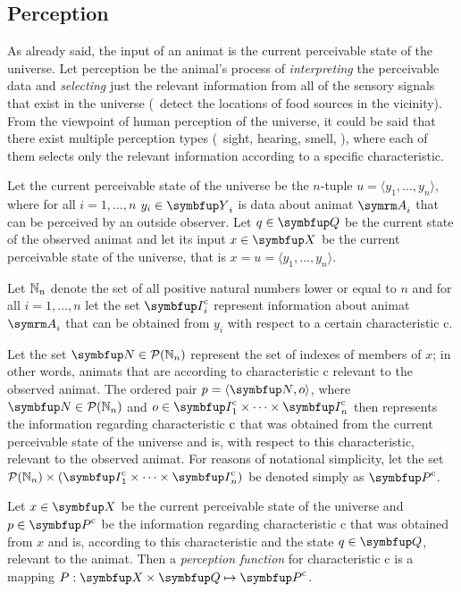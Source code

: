 \subsection{Perception}
As already said, the input of an animat is the current perceivable state of the universe. Let perception be the animal's process of \emph{interpreting} the perceivable data and \emph{selecting} just the relevant information from all of the sensory signals that exist in the universe (\eg\ detect the locations of food sources in the vicinity). From the viewpoint of human perception of the universe, it could be said that there exist multiple perception types (\ie\ sight, hearing, smell, \etc), where each of them selects only the relevant information according to a specific characteristic.

Let the current perceivable state of the universe be the $n$-tuple  $u=\langle y_1,\ldots,y_n\rangle$, where for all $i=1,\ldots,n$ $y_i \in \set{Y}_i$ is data about animat $\autom{A}_i$ that can be perceived by an outside observer. Let $q \in \set{Q}$ be the current state of the observed animat and let its input $x \in \set{X}$ be the current perceivable state of the universe, that is  $x=u=\langle y_1,\ldots,y_n \rangle$.

Let $\mathbb{N}_n$ denote the set of all positive natural numbers lower or equal to $n$ and for all $i=1,\ldots,n$ let the set $\set{I}^\textnormal{c}_i$ represent information about animat $\autom{A}_i$ that can be obtained from $y_i$ with respect to a certain characteristic $\mathrm{c}$.

Let the set $\set{N} \in \powset{\N_n}$ represent the set of indexes of members of $x$; in other words, animats that are according to characteristic $\mathrm{c}$ relevant to the observed animat. The ordered pair $p=\langle\set{N},o\rangle$, where $\set{N} \in \powset{\N_n}$ and $o \in \set{I}^\textnormal{c}_1 \times \cdots \times \set{I}^\textnormal{c}_n$ then represents the information regarding characteristic $\textnormal{c}$ that was obtained from the current perceivable state of the universe and is, with respect to this characteristic, relevant to the observed animat. For reasons of notational simplicity, let the set $\powset{\N_n} \times (\set{I}^\textnormal{c}_1 \times \cdots \times \set{I}^\textnormal{c}_n)$ be denoted simply as $\set{P}^\textnormal{c}$.

\begin{definition}
  \label{def:animat:Pi}
  Let $x \in \set{X}$ be the current perceivable state of the universe and $p \in \set{P}^\textnormal{c}$ be the information regarding characteristic $\mathrm{c}$ that was obtained from $x$ and is, according to this characteristic and the state $q \in \set{Q}$, relevant to the animat. Then a \emph{perception function} for characteristic $\mathrm{c}$ is a mapping $P: \set{X} \times \set{Q} \mapsto \set{P}^\textnormal{c}$.
\end{definition}

